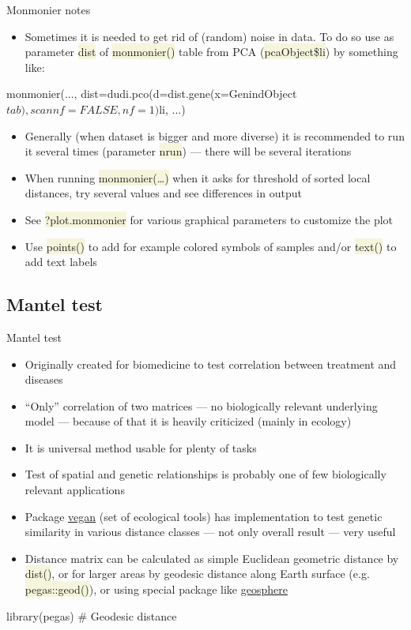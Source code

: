 \documentclass[compress, ucs, xelatex, 11pt, xcolor=svgnames, aspectratio=169,
	hyperref={
		bookmarks=true,
		unicode=true,
		colorlinks=true,
		pdftitle={Molecular data in R},
		plainpages=false,
		pdfauthor={Vojtech Zeisek},
		pdfsubject={Course about phylogeny and evolution in R},
		pdfcreator={XeLaTeX},
		pdfkeywords={R, evolution, phylogeny, molecular data},
		linkcolor=Crimson, %
		anchorcolor=Magenta, %
		citecolor=Magenta, %
		filecolor=Magenta, %
		menucolor=Magenta, %
		urlcolor=DodgerBlue, %
		pdftex},
	url={hyphens, lowtilde} %
	]{beamer}
\renewcommand{\texttt}[1]{\colorbox{Beige}{{\ttfamily #1}}}
\begin{document}
\begin{frame}[fragile]{Monmonier notes}
	\begin{itemize}
		\item Sometimes it is needed to get rid of (random) noise in data. To do so use as parameter \texttt{dist} of \texttt{monmonier()} table from PCA (\texttt{pcaObject\$li}) by something like:
	\end{itemize}
	\begin{spluscode}
    monmonier(..., dist=dudi.pco(d=dist.gene(x=GenindObject$tab),
      scannf=FALSE, nf=1)$li, ...)
	\end{spluscode}
	\begin{itemize}
		\item Generally (when dataset is bigger and more diverse) it is recommended to run it several times (parameter \texttt{nrun}) --- there will be several iterations
		\item When running \texttt{monmonier(\ldots)} when it asks for threshold of sorted local distances, try several values and see differences in output
		\item See \texttt{?plot.monmonier} for various graphical parameters to customize the plot
		\item Use \texttt{points()} to add for example colored symbols of samples and/or \texttt{text()} to add text labels
	\end{itemize}
\end{frame}

\subsection{Mantel test}

\begin{frame}[fragile]{Mantel test}
	\begin{itemize}
		\item Originally created for biomedicine to test correlation between treatment and diseases
		\item \enquote{Only} correlation of two matrices --- no biologically relevant underlying model --- because of that it is heavily criticized (mainly in ecology)
		\item It is universal method usable for plenty of tasks
		\item Test of spatial and genetic relationships is probably one of few biologically relevant applications
		\item Package \href{https://CRAN.R-project.org/package=vegan}{vegan} (set of ecological tools) has implementation to test genetic similarity in various distance classes --- not only overall result --- very useful
		\item Distance matrix can be calculated as simple Euclidean geometric distance by \texttt{dist()}, or for larger areas by geodesic distance along Earth surface (e.g. \texttt{pegas::geod()}), or using special package like \href{https://CRAN.R-project.org/package=geosphere}{geosphere}
	\end{itemize}
	\begin{spluscode}
    library(pegas) # Geodesic distance
	\end{spluscode}
\end{frame}
\end{document}
